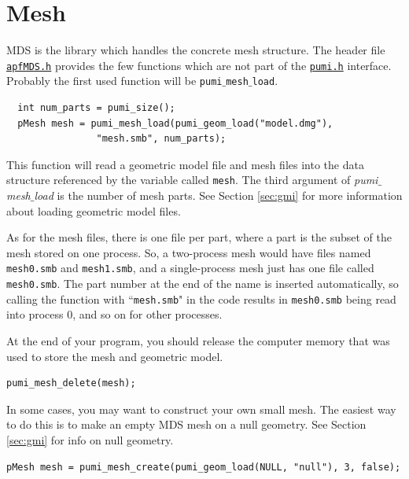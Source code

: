 \documentclass{article}
\begin{document}
\section{Mesh}
\label{sec:mds}

MDS is the library which handles the concrete mesh structure.
The header file
\href{https://github.com/SCOREC/core/blob/master/mds/apfMDS.h}{\texttt{apfMDS.h}}
provides the few functions which are not part of the
\href{https://github.com/SCOREC/core/blob/master/pumi/pumi.h}{\texttt{pumi.h}}
interface.
Probably the first used function will be \texttt{pumi$\_$mesh$\_$load}.

\begin{lstlisting}
  int num_parts = pumi_size();
  pMesh mesh = pumi_mesh_load(pumi_geom_load("model.dmg"),
                "mesh.smb", num_parts);
\end{lstlisting}

This function will read a geometric model file and mesh files into
the data structure referenced by the variable called \texttt{mesh}.
The third argument of \emph{pumi$\_$mesh$\_$load} is the number of mesh parts.
See Section \ref{sec:gmi} for more information about loading
geometric model files.

As for the mesh files, there is one file per part, where a
part is the subset of the mesh stored on one process.
So, a two-process mesh would have files named \texttt{mesh0.smb}
and \texttt{mesh1.smb}, and a single-process mesh just has one file
called \texttt{mesh0.smb}.
The part number at the end of the name is inserted automatically,
so calling the function with ``\texttt{mesh.smb}" in the code
results in \texttt{mesh0.smb} being read into process 0, and so
on for other processes.

At the end of your program, you should release the computer
memory that was used to store the mesh and geometric model.

\begin{lstlisting}
pumi_mesh_delete(mesh);
\end{lstlisting}

In some cases, you may want to construct your own small mesh.
The easiest way to do this is to make an empty MDS mesh
on a null geometry.
See Section \ref{sec:gmi} for info on null geometry.

\begin{lstlisting}
pMesh mesh = pumi_mesh_create(pumi_geom_load(NULL, "null"), 3, false);
\end{lstlisting}
\end{document}
